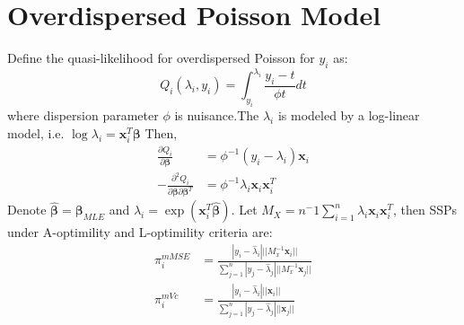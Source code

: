 \documentclass[]{article}
\begin{document}
\section{Overdispersed Poisson Model}
Define the quasi-likelihood for overdispersed Poisson for $y_i$ as:
$$
Q_i(\lambda_i, y_i) = \int_{y_i}^{\lambda_i}\frac{y_i - t}{\phi t}dt
$$
where dispersion parameter $\phi$ is nuisance.The $\lambda_i$ is modeled by a log-linear model, i.e. $\log{\lambda_i} = \boldsymbol{x}_i^{T}\boldsymbol{\beta}$ Then,
\begin{align*}
	\frac{\partial Q_i}{\partial \boldsymbol{\beta}} &= \phi^{-1}(y_i - \lambda_i)\boldsymbol{x}_i\\
	-\frac{\partial^2 Q_i}{\partial \boldsymbol{\beta}\partial \boldsymbol{\beta}^{T}} &= \phi^{-1}\lambda_i\boldsymbol{x}_i\boldsymbol{x}_i^{T}
\end{align*}
Denote $\hat{\boldsymbol{\beta}} = \boldsymbol{\beta}_{MLE}$ and $\hat{\lambda}_i = \exp(\boldsymbol{x}_i^{T}\hat{\boldsymbol{\beta}})$. Let $M_X = n^-1\sum_{i=1}^{n}\hat{\lambda}_i\boldsymbol{x}_i\boldsymbol{x}_i^{T}$, then SSPs under A-optimility and L-optimility criteria are:
\begin{align*}
	\pi_i^{mMSE} &= \frac{|y_i - \hat{\lambda}_i|||M_x^{-1}\boldsymbol{x}_i||}{\sum_{j=1}^{n}|y_j - \hat{\lambda}_j|||M_x^{-1}\boldsymbol{x}_j||}\\
	\pi_i^{mVc} &=\frac{|y_i - \hat{\lambda}_i|||\boldsymbol{x}_i||}{\sum_{j=1}^{n}|y_j - \hat{\lambda}_j|||\boldsymbol{x}_j||}
\end{align*}
\end{document}
